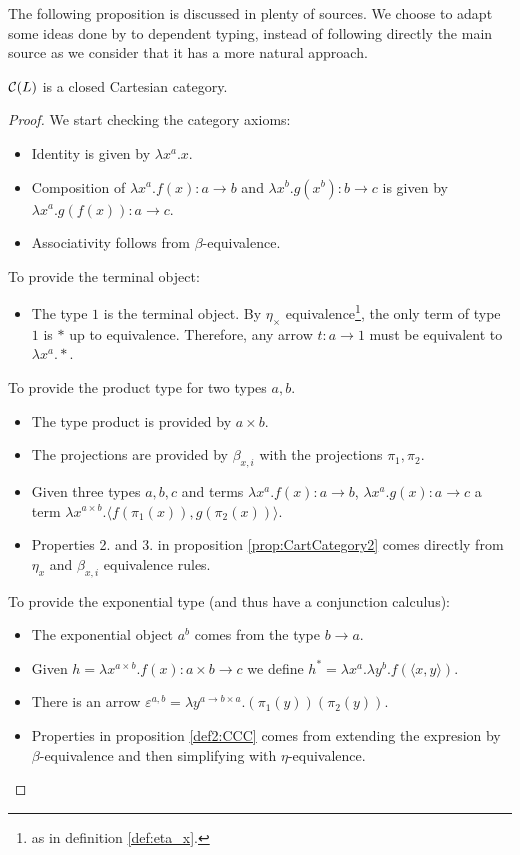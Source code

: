 The following proposition is discussed in plenty of sources. We choose to adapt some ideas done by \cite{seely1984locally} to dependent typing, instead of following directly the main source \cite{lambek1985cartesian} as we consider that it has a more natural approach.
\begin{proposition}
  $\mathcal{C} (L)$ is a closed Cartesian  category. 
\end{proposition}
\begin{proof}
  We start checking the category axioms:
  \begin{itemize}
  \item Identity is given by $\lambda x^a.x$.
  \item Composition of $\lambda x^a. f(x):  a\to b$ and $\lambda x^b. g(x^b): b \to c$ is given by $\lambda x^a. g(f(x)): a \to c$.
  \item Associativity follows from $\beta$-equivalence.\\
  \end{itemize}
  To provide the terminal object:
  \begin{itemize}
  \item The type $1$ is the terminal object. By $\eta_\times$ equivalence\footnote{as in definition \ref{def:eta_x}.}, the only term of type $1$ is $*$ up to equivalence. Therefore, any arrow $t:a \to 1$ must be equivalent to $\lambda x^a. *$.\\
  \end{itemize}
  To provide the product type for two types $a,b$.
  \begin{itemize}
  \item The type product is provided by $a \times b$.
  \item The projections are provided by $\beta_{x,i}$ with the projections $\pi_1,\pi_2$.
  \item Given three types $a,b,c$ and terms $\lambda x^a. f(x) : a\to b$, $\lambda x^a. g(x) : a\to c$ a term $\lambda x^{a\times b}.\langle f(\pi_1(x)),g(\pi_2(x))\rangle $.
  \item Properties 2. and 3. in proposition \ref{prop:CartCategory2} comes directly from $\eta_x$ and $\beta_{x,i}$ equivalence rules.\\
  \end{itemize}
  To provide the exponential type (and thus have a conjunction calculus):
  \begin{itemize}
  \item The exponential object $a^b$ comes from the type $b\to a$.
  \item Given $h = \lambda x^{a\times b}. f(x): a\times b \to c$  we define $h^* = \lambda x^a. \lambda y^b. f(\langle x,y\rangle)$.
  \item There is an arrow $\varepsilon^{a,b} = \lambda y^{a\to b \times a}. (\pi_1(y))(\pi_2(y))$.
  \item Properties in proposition \ref{def2:CCC} comes from extending the expresion by $\beta$-equivalence and then simplifying with $\eta$-equivalence.
  \end{itemize}
\end{proof}

